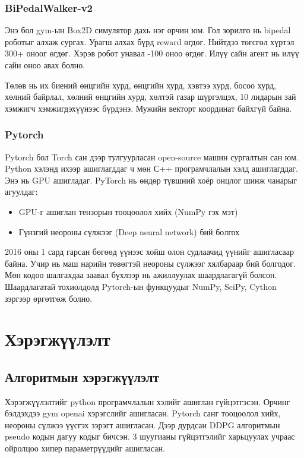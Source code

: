 \documentclass[12pt,A4]{report}
\begin{document}
\subsection{BiPedalWalker-v2}

Энэ бол gym-ын Box2D симулятор дахь нэг орчин юм. Гол зорилго нь bipedal роботыг алхаж сургах. Урагш алхах бүрд reward өгдөг. Нийтдээ төгсгөл хүртэл 300+ оноог өгдөг. Хэрэв робот унавал -100 оноо өгдөг. Илүү сайн агент нь илүү сайн оноо авах болно. 

Төлөв нь их биений өнцгийн хурд, өнцгийн хурд, хэвтээ хурд, босоо хурд, хөлний байрлал, хөлний өнцгийн хурд, хөлтэй газар шүргэлцэх, 10 лидарын зай хэмжигч хэмжигдэхүүнээс бүрдэнэ. Мужийн векторт координат байхгүй байна.

\subsection{Pytorch}

Pytorch бол Torch сан дээр тулгуурласан open-source машин сургалтын сан юм. Python хэлэнд ихээр ашиглагддаг ч мөн С++ програмчлалын хэлд ашиглагддаг. Энэ нь GPU ашигладаг. PyTorch нь өндөр түвшний хоёр онцлог шинж чанарыг агуулдаг:

\begin{itemize}
	\item GPU-г ашиглан тензорын тооцоолол хийх (NumPy гэх мэт) 
	\item Гүнзгий неороны сүлжээг (Deep neural network) бий болгох
\end{itemize}

2016 оны 1 сард гарсан бөгөөд үүнээс хойш олон судлаачид үүнийг ашигласаар байна. Учир нь маш нарийн төвөгтэй неороны сүлжээг хялбараар бий болгодог. Мөн кодоо шалгахдаа заавал бүхлээр нь ажиллуулах шаардлагагүй болсон. Шаардлагатай тохиолдолд Pytorch-ын функцуудыг NumPy, SciPy, Cython зэргээр өргөтгөж болно. 
 
\chapter{Хэрэгжүүлэлт}

\section{Алгоритмын хэрэгжүүлэлт}

Хэрэгжүүлэлтийг python програмчлалын хэлийг ашиглан гүйцэтгэсэн. Орчинг бэлдэхдээ gym openai хэрэгслийг ашигласан. Pytorch санг тооцоолол хийх, неороны сүлжээ үүсгэх зэрэгт ашигласан. Дээр дурдсан DDPG алгоритмын pseudo кодын дагуу кодыг бичсэн. 3 шуугианы гүйцэтгэлийг харьцуулах учраас ойролцоо хипер параметрүүдийг ашигласан.
\end{document}
